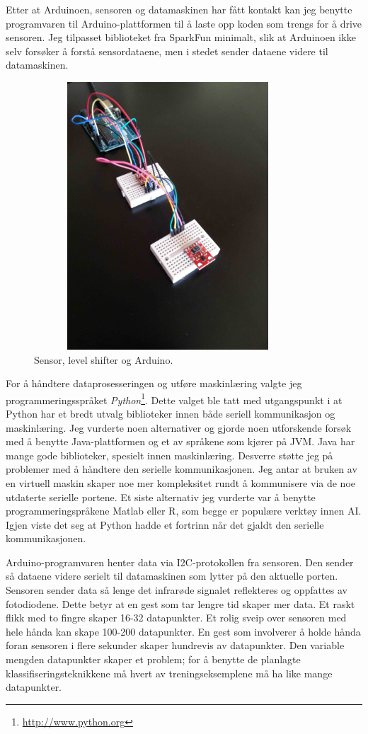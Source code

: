 Etter at Arduinoen, sensoren og datamaskinen har fått kontakt kan jeg benytte programvaren til Arduino-plattformen til å laste opp koden som trengs for å drive sensoren. Jeg tilpasset biblioteket fra SparkFun minimalt, slik at Arduinoen ikke selv forsøker å forstå sensordataene, men i stedet sender dataene videre til datamaskinen.
\begin{figure}[h]
\centering
\includegraphics[width=10cm, height=10cm]{fig/singlesensor}
\caption{Sensor, level shifter og Arduino.}
\label{fig:single-sensor}
\end{figure}
For å håndtere dataprosesseringen og utføre maskinlæring valgte jeg programmeringsspråket \emph{Python}\footnote{\url{http://www.python.org}}. Dette valget ble tatt med utgangspunkt i at Python har et bredt utvalg biblioteker innen både seriell kommunikasjon og maskinlæring. Jeg vurderte noen alternativer og gjorde noen utforskende forsøk med å benytte Java-plattformen og et av språkene som kjører på JVM. Java har mange gode biblioteker, spesielt innen maskinlæring. Desverre støtte jeg på problemer med å håndtere den serielle kommunikasjonen. Jeg antar at bruken av en virtuell maskin skaper noe mer kompleksitet rundt å kommunisere via de noe utdaterte serielle portene. Et siste alternativ jeg vurderte var å benytte programmeringspråkene Matlab eller R, som begge er populære verktøy innen AI. Igjen viste det seg at Python hadde et fortrinn når det gjaldt den serielle kommunikasjonen.

Arduino-programvaren henter data via I2C-protokollen fra sensoren. Den sender så dataene videre serielt til datamaskinen som lytter på den aktuelle porten. Sensoren sender data så lenge det infrarøde signalet reflekteres og oppfattes av fotodiodene. Dette betyr at en gest som tar lengre tid skaper mer data. Et raskt flikk med to fingre skaper 16-32 datapunkter. Et rolig sveip over sensoren med hele hånda kan skape 100-200 datapunkter. En gest som involverer å holde hånda foran sensoren i flere sekunder skaper hundrevis av datapunkter. Den variable mengden datapunkter skaper et problem; for å benytte de planlagte klassifiseringsteknikkene må hvert av treningseksemplene må ha like mange datapunkter.

